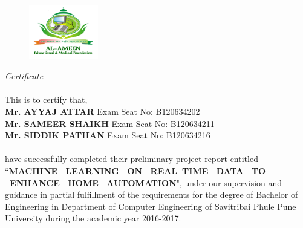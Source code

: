 \newpage
\thispagestyle{empty}


\begin{center}

\begin{figure}
	\centering
	\includegraphics[width=0.27\textwidth]{./InitialPages/al_ameen-logo}
\end{figure}

\emph{\LARGE Certificate}\\[2.0cm]
\end{center}
\paragraph{}
\normalsize This is to certify that,\\
\hspace*{3cm}\textbf{Mr. AYYAJ ATTAR} \hfill Exam Seat No: B120634202\\
\hspace*{3cm}\textbf{Mr. SAMEER SHAIKH} \hfill Exam Seat No: B120634211\\
\hspace*{3cm}\textbf{Mr. SIDDIK PATHAN} \hfill Exam Seat No: B120634216\\\\
\noindent
have  successfully completed their preliminary project report entitled \linebreak``\textbf{MACHINE \ LEARNING \ ON \ REAL--TIME \ DATA \ TO \ ENHANCE \ HOME \ AUTOMATION}", under our supervision and guidance in partial fulfillment of the requirements for the degree of Bachelor of Engineering in Department of Computer Engineering of Savitribai Phule Pune University during the academic year 2016-2017.
\\[1.0cm]

